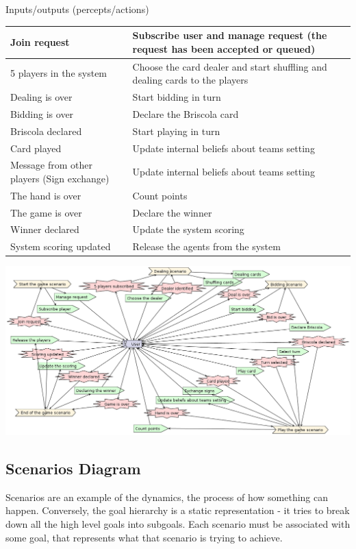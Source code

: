 \documentclass[a4paper]{article}
\begin{document}
Inputs/outputs (percepts/actions)
\begin{table}[htp]
  \begin{tabular}{|l|l|}	
    Join request	& Subscribe user and manage request (the request has been accepted or queued) \\
    \hline
    5 players in the system	& Choose the card dealer and start shuffling and dealing cards to the players \\
    \hline
    Dealing is over	& Start bidding in turn \\
    \hline
    Bidding is over	& Declare the Briscola card \\ 
    \hline
    Briscola declared	& Start playing in turn \\
    \hline
    Card played	& Update internal beliefs about teams setting \\
    \hline
    Message from other players (Sign exchange)	& Update internal beliefs about teams setting \\
    \hline
    The hand is over	& Count points \\
    \hline
    The game is over	& Declare the winner \\
    \hline
    Winner declared	 & Update the system scoring \\
    \hline
    System scoring updated	& Release the agents from the system \\
    \hline
  \end{tabular}
\end{table}

\includegraphics[keepaspectratio,scale=0.3]{pdt/images/system_specification/analysis_overview.png}

\subsection{Scenarios Diagram}

Scenarios are an example of the dynamics, the process of how something can happen. Conversely, the goal hierarchy is a static representation  - it tries to break down all the high level goals into subgoals. Each scenario must be associated with some goal, that represents what that scenario is trying to achieve. 
\end{document}
